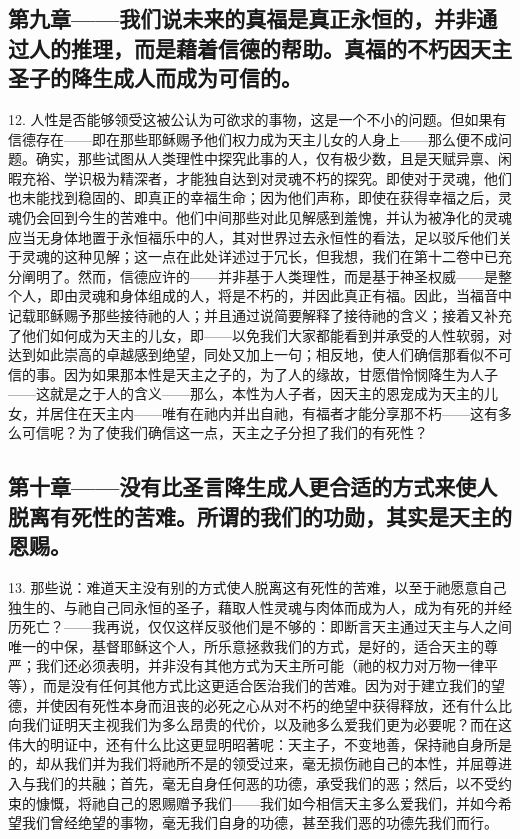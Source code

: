 \subsection{第九章——我们说未来的真福是真正永恒的，并非通过人的推理，而是藉着信德的帮助。真福的不朽因天主圣子的降生成人而成为可信的。}

12. 人性是否能够领受这被公认为可欲求的事物，这是一个不小的问题。但如果有信德存在——即在那些耶稣赐予他们权力成为天主儿女的人身上——那么便不成问题。确实，那些试图从人类理性中探究此事的人，仅有极少数，且是天赋异禀、闲暇充裕、学识极为精深者，才能独自达到对灵魂不朽的探究。即使对于灵魂，他们也未能找到稳固的、即真正的幸福生命；因为他们声称，即使在获得幸福之后，灵魂仍会回到今生的苦难中。他们中间那些对此见解感到羞愧，并认为被净化的灵魂应当无身体地置于永恒福乐中的人，其对世界过去永恒性的看法，足以驳斥他们关于灵魂的这种见解；这一点在此处详述过于冗长，但我想，我们在第十二卷中已充分阐明了。然而，信德应许的——并非基于人类理性，而是基于神圣权威——是整个人，即由灵魂和身体组成的人，将是不朽的，并因此真正有福。因此，当福音中记载耶稣赐予那些接待祂的人；并且通过说简要解释了接待祂的含义；接着又补充了他们如何成为天主的儿女，即——以免我们大家都能看到并承受的人性软弱，对达到如此崇高的卓越感到绝望，同处又加上一句；相反地，使人们确信那看似不可信的事。因为如果那本性是天主之子的，为了人的缘故，甘愿借怜悯降生为人子——这就是之于人的含义——那么，本性为人子者，因天主的恩宠成为天主的儿女，并居住在天主内——唯有在祂内并出自祂，有福者才能分享那不朽——这有多么可信呢？为了使我们确信这一点，天主之子分担了我们的有死性？\par


\subsection{第十章——没有比圣言降生成人更合适的方式来使人脱离有死性的苦难。所谓的我们的功勋，其实是天主的恩赐。}

13. 那些说：难道天主没有别的方式使人脱离这有死性的苦难，以至于祂愿意自己独生的、与祂自己同永恒的圣子，藉取人性灵魂与肉体而成为人，成为有死的并经历死亡？——我再说，仅仅这样反驳他们是不够的：即断言天主通过天主与人之间唯一的中保，基督耶稣这个人，所乐意拯救我们的方式，是好的，适合天主的尊严；我们还必须表明，并非没有其他方式为天主所可能（祂的权力对万物一律平等），而是没有任何其他方式比这更适合医治我们的苦难。因为对于建立我们的望德，并使因有死性本身而沮丧的必死之心从对不朽的绝望中获得释放，还有什么比向我们证明天主视我们为多么昂贵的代价，以及祂多么爱我们更为必要呢？而在这伟大的明证中，还有什么比这更显明昭著呢：天主子，不变地善，保持祂自身所是的，却从我们并为我们将祂所不是的领受过来，毫无损伤祂自己的本性，并屈尊进入与我们的共融；首先，毫无自身任何恶的功德，承受我们的恶；然后，以不受约束的慷慨，将祂自己的恩赐赠予我们——我们如今相信天主多么爱我们，并如今希望我们曾经绝望的事物，毫无我们自身的功德，甚至我们恶的功德先我们而行。\par

